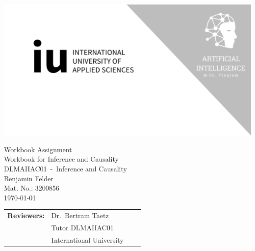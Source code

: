 
\def\Mytitle{Workbook for Inference and Causality}
\def\Mysubtitle{Workbook Assignment}
\def\Mycourse{DLMAIIAC01\ -\ Inference and Causality}
\def\Myauthor{Benjamin Felder}
\def\MyMatricNum{3200856}
\def\Mydate{\germandatetime\today}


\def\RNameA{Dr.\ Bertram Taetz}
\def\RFunctionA{Tutor DLMAIIAC01}
\def\RInstitutionA{International University}

\def\RNameB{}
\def\RFunctionB{}
\def\RInstitutionB{}

\def\RNameC{}
\def\RFunctionC{}
\def\RInstitutionC{}

\thispagestyle{empty}

\centerline{\includegraphics[width=\paperwidth]{template/img/cover-image.png}}

\vspace{8.5em}

{\Large \Mysubtitle}\\
{\Huge \Mytitle}\\
{\LARGE \Mycourse}\\
{\LARGE \Myauthor}\\
{\Large Mat. No.: \MyMatricNum}\\
{\Large \Mydate}

\vspace*{\fill}

\begin{tabular}{p{0.8in} p{1.5in} p{1.5in} p{1.5in}}
    \textbf{Reviewers:} & \RNameA        & \RNameB        & \RNameC        \\
                        & \RFunctionA    & \RFunctionB    & \RFunctionC    \\
                        & \RInstitutionA & \RInstitutionB & \RInstitutionC
\end{tabular}


\restoregeometry{}
\clearpage
